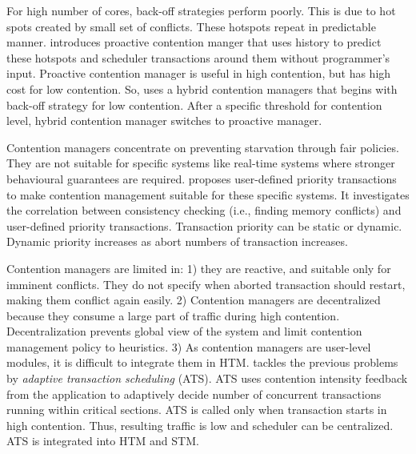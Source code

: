 For high number of cores, back-off strategies perform poorly. This
is due to hot spots created by small set of conflicts. These hotspots
repeat in predictable manner. \cite{Blake:2009:PTS:1669112.1669133}
introduces proactive contention manger that uses history to predict
these hotspots and scheduler transactions around them without programmer's
input. Proactive contention manager is useful in high contention,
but has high cost for low contention. So, \cite{Blake:2009:PTS:1669112.1669133}
uses a hybrid contention managers that begins with back-off strategy
for low contention. After a specific threshold for contention level,
hybrid contention manager switches to proactive manager.

Contention managers concentrate on preventing starvation through fair
policies. They are not suitable for specific systems like real-time
systems where stronger behavioural guarantees are required. \cite{gottschlich2008extending}
proposes user-defined priority transactions to make contention management
suitable for these specific systems. It investigates the correlation
between consistency checking (i.e., finding memory conflicts) and
user-defined priority transactions. Transaction priority can be static
or dynamic. Dynamic priority increases as abort numbers of transaction
increases.

Contention managers are limited in: 1) they are reactive, and suitable
only for imminent conflicts. They do not specify when aborted transaction
should restart, making them conflict again easily. 2) Contention managers
are decentralized because they consume a large part of traffic during
high contention. Decentralization prevents global view of the system
and limit contention management policy to heuristics. 3) As contention
managers are user-level modules, it is difficult to integrate them
in HTM. \cite{Scherer:2005:ACM:1073814.1073861} tackles the previous
problems by \textit{adaptive transaction scheduling} (ATS). ATS uses
contention intensity feedback from the application to adaptively decide
number of concurrent transactions running within critical sections.
ATS is called only when transaction starts in high contention. Thus,
resulting traffic is low and scheduler can be centralized. ATS is
integrated into HTM and STM.

